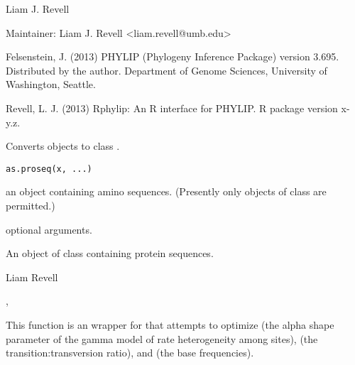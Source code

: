 \documentclass[a4paper]{book}
\begin{document}
%
\begin{Author}\relax
Liam J. Revell

Maintainer: Liam J. Revell <liam.revell@umb.edu>
\end{Author}
%
\begin{References}\relax
Felsenstein, J. (2013) PHYLIP (Phylogeny Inference Package) version 3.695. Distributed by the author. Department of Genome Sciences, University of Washington, Seattle.

Revell, L. J. (2013) Rphylip: An R interface for PHYLIP. R package version x-y.z.
\end{References}
%
\begin{Description}\relax
Converts objects to class .
\end{Description}
%
\begin{Usage}
\begin{verbatim}
as.proseq(x, ...)
\end{verbatim}
\end{Usage}
%
\begin{Arguments}
\begin{ldescription}
\item[\code{x}] an object containing amino sequences. (Presently only objects of class  are permitted.)
\item[\code{...}] optional arguments.
\end{ldescription}
\end{Arguments}
%
\begin{Value}
An object of class  containing protein sequences.
\end{Value}
%
\begin{Author}\relax
Liam Revell 
\end{Author}
%
\begin{SeeAlso}\relax
{}, 
\end{SeeAlso}
%
\begin{Description}\relax
This function is an wrapper for  that attempts to optimize  (the alpha shape parameter of the gamma model of rate heterogeneity among sites),  (the transition:transversion ratio), and  (the base frequencies).
\end{Description}
\end{document}
